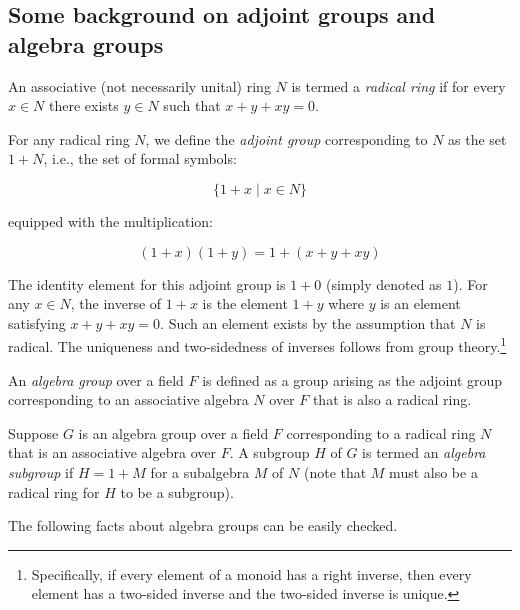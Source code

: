 \subsection{Some background on adjoint groups and algebra groups}\label{sec:adjoint-group}

An associative (not necessarily unital) ring $N$ is termed a {\em
  radical ring} if for every $x \in N$ there exists $y \in N$ such
that $x + y + xy = 0$.

For any radical ring $N$, we define the {\em adjoint group}
corresponding to $N$ as the set $1 + N$, i.e., the set of formal symbols:

$$\{ 1 + x \mid x \in N \}$$

equipped with the multiplication:

$$(1 + x)(1 + y) = 1 + (x + y + xy)$$

The identity element for this adjoint group is $1 + 0$ (simply denoted
as $1$). For any $x \in N$, the inverse of $1 + x$ is the element $1 +
y$ where $y$ is an element satisfying $x + y + xy = 0$. Such an
element exists by the assumption that $N$ is radical. The uniqueness
and two-sidedness of inverses follows from group
theory.\footnote{Specifically, if every element of a monoid has a
  right inverse, then every element has a two-sided inverse and the
  two-sided inverse is unique.}

An {\em algebra group} over a field $F$ is defined as a group arising
as the adjoint group corresponding to an associative algebra $N$ over
$F$ that is also a radical ring.

Suppose $G$ is an algebra group over a field $F$ corresponding to a
radical ring $N$ that is an associative algebra over $F$. A subgroup
$H$ of $G$ is termed an {\em algebra subgroup} if $H = 1 + M$ for a
subalgebra $M$ of $N$ (note that $M$ must also be a radical ring for
$H$ to be a subgroup).

The following facts about algebra groups can be easily checked.

